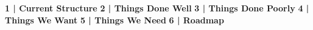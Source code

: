 \documentclass[12pt , letterpaper]{article}
\begin{document}
\begin{titlepage}
    \begin{center} \Large {}  \end{center}
\end{titlepage}

\tableofcontents

{\bfseries 1 | Current Structure} \newline 
{\bfseries 2 | Things Done Well} \newline
{\bfseries 3 | Things Done Poorly} \newline
{\bfseries 4 | Things We Want} \newline
{\bfseries 5 | Things We Need} \newline
{\bfseries 6 | Roadmap} \newline
\end{document}
